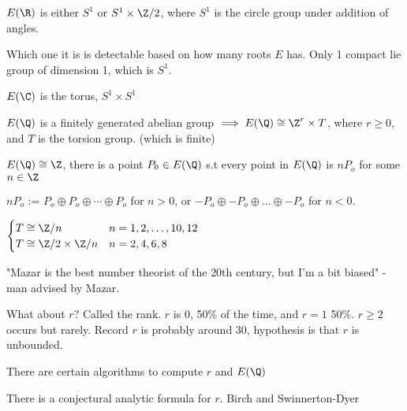 \documentclass[10pt]{article}
\begin{document}
\begin{exm*}
    $E(\R)$ is either $S^1$ or $S^1 \times \Z/2$, where $S^1$ is the circle group under addition of angles.
\end{exm*}
Which one it is is detectable based on how many roots $E$ has. Only 1 compact lie group of dimension 1, which is $S^1$.

\begin{exm*}
    $E(\C)$ is the torus, $S^1 \times S^1$
\end{exm*}

\begin{thm}
    $E(\Q)$ is a finitely generated abelian group $\implies E(\Q) \cong \Z^r \times T$, where $r \geq 0$, and $T$ is the torsion group. (which is finite) %
\end{thm}


\begin{exm*}
    $E(\Q) \cong \Z$, there is a point $P_0 \in E(\Q)$ s.t every point in $E(\Q)$ is $nP_o$ for some $n\in \Z$
\end{exm*}
$nP_o$ := $P_o \oplus P_o \oplus \cdots \oplus P_o$ for $n > 0$, or $-P_o \oplus -P_o \oplus \ldots \oplus -P_o$ for $n < 0$.

\begin{thm}[Mazar, 1977]
    $\begin{cases}
        T \cong \Z/n & n = 1, 2, \ldots, 10, 12\\
        T \cong \Z/2 \times \Z/n & n = 2, 4, 6, 8\\
    \end{cases}$
\end{thm}

"Mazar is the best number theorist of the 20th century, but I'm a bit biased" - man advised by Mazar.

What about $r$? Called the rank. $r$ is 0, 50\% of the time, and $r = 1$ 50\%. $r \geq 2$ occurs but rarely. Record $r$ is probably around 30, hypothesis is that $r$ is unbounded.

There are certain algorithms to compute $r$ and $E(\Q)$

\begin{rmk}
    There is a conjectural analytic formula for $r$. Birch and Swinnerton-Dyer %
\end{rmk}

\end{document}
